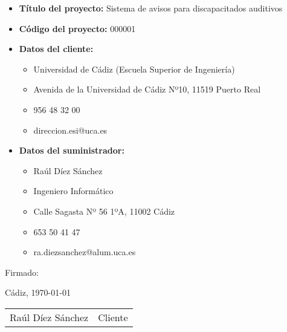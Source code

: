 \begin{itemize}
    \item \textbf{Título del proyecto:} Sistema de avisos para discapacitados auditivos \\
    \item \textbf{Código del proyecto:} 000001 \\
    \item \textbf{Datos del cliente:} \\
        \begin{itemize}
            \vspace{-0.4cm}
            \item Universidad de Cádiz (Escuela Superior de Ingeniería)
            \item Avenida de la Universidad de Cádiz Nº10, 11519 Puerto Real
            \item 956 48 32 00
            \item direccion.esi@uca.es
        \end{itemize}
    \item \textbf{Datos del suministrador:} \\
        \begin{itemize}
            \vspace{-0.4cm}
            \item Raúl Díez Sánchez
            \item Ingeniero Informático
            \item Calle Sagasta Nº 56 1ºA, 11002 Cádiz
            \item 653 50 41 47
            \item ra.diezsanchez@alum.uca.es
        \end{itemize}
\end{itemize}

\vspace{2cm}

Firmado:

\vspace{-0.9cm} 
\begin{flushright} Cádiz, \today \end{flushright}

\vspace{2cm}

\begin{table}[h]
    \centering
    \begin{tabular}{lr}
        Raúl Díez Sánchez & \hspace{9cm}Cliente
    \end{tabular}
\end{table}